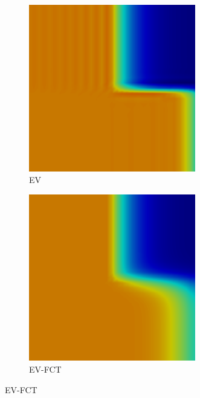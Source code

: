 \begin{frame}
\begin{figure}[h]
\begin{subfigure}{0.3\textwidth}
      \centering
      \includegraphics[width=0.8\textwidth]{./figures/EV.png}
      \caption{EV}
   \end{subfigure}
   \begin{subfigure}{0.3\textwidth}
      \centering
      \includegraphics[width=0.8\textwidth]{./figures/EVFCT.png}
      \caption{EV-FCT}
   \end{subfigure}
\end{figure}

\end{frame}
